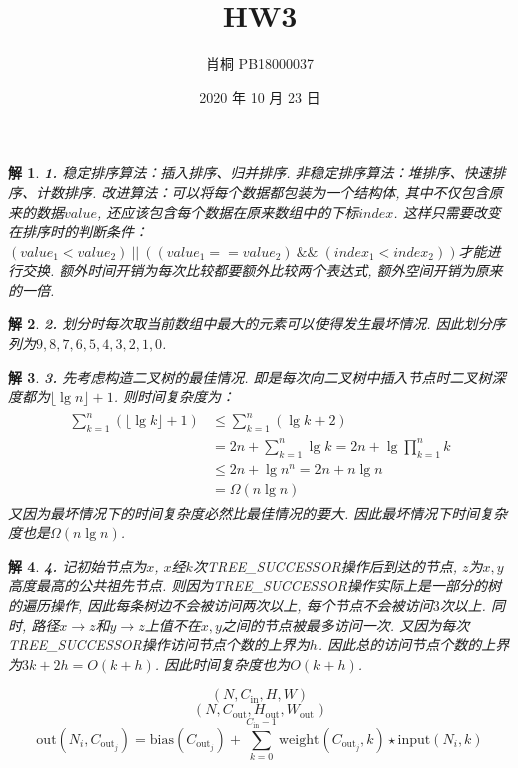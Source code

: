 \documentclass{article}
\begin{document}
	\title{HW3}
	\author{肖桐 PB18000037}
	\date{2020 年 10 月 23 日}
	\maketitle

	\newtheorem*{solution}{解}

	\begin{solution}\textnormal{\textbf{1.}}
		稳定排序算法：插入排序、归并排序.\newline
		非稳定排序算法：堆排序、快速排序、计数排序.\newline
		改进算法：可以将每个数据都包装为一个结构体, 其中不仅包含原来的数据$value$,
		还应该包含每个数据在原来数组中的下标$index$.\newline
		这样只需要改变在排序时的判断条件：$(value_1 < value_2)\ ||\ ((value_1 == value_2)\ \&\&\ (index_1 < index_2))$才能进行交换.\newline
		额外时间开销为每次比较都要额外比较两个表达式, 额外空间开销为原来的一倍.
	\end{solution}
	\begin{solution}\textnormal{\textbf{2.}}
		划分时每次取当前数组中最大的元素可以使得发生最坏情况. 因此划分序列为$9, 8, 7, 6, 5, 4, 3, 2, 1, 0$.
	\end{solution}
	\begin{solution}\textnormal{\textbf{3.}}
		先考虑构造二叉树的最佳情况. 即是每次向二叉树中插入节点时二叉树深度都为$\lfloor\lg n\rfloor + 1$.
		则时间复杂度为：
		$$
		\begin{aligned}
			\begin{split}
				\sum_{k = 1}^{n}(\lfloor\lg k\rfloor + 1) &\leq \sum_{k = 1}^{n}(\lg k + 2) \\
				&= 2n + \sum_{k = 1}^{n}\lg k = 2n + \lg\prod_{k = 1}^{n}k \\
				&\leq 2n + \lg n^n = 2n + n\lg n \\
				&= \Omega(n\lg n)
			\end{split}
		\end{aligned}
		$$
		又因为最坏情况下的时间复杂度必然比最佳情况的要大. 因此最坏情况下时间复杂度也是$\Omega(n\lg n)$.
	\end{solution}
	\begin{solution}\textnormal{\textbf{4.}}
		记初始节点为$x$, $x$经$k$次\textnormal{TREE\_SUCCESSOR}操作后到达的节点, $z$为$x, y$高度最高的公共祖先节点.\newline
		则因为\textnormal{TREE\_SUCCESSOR}操作实际上是一部分的树的遍历操作, 因此每条树边不会被访问两次以上, 每个节点不会被访问$3$次以上.\newline
		同时, 路径$x \to z$和$y \to z$上值不在$x, y$之间的节点被最多访问一次. 又因为每次\textnormal{TREE\_SUCCESSOR}操作访问节点个数的上界为$h$.\newline
		因此总的访问节点个数的上界为$3k + 2h = O(k + h)$. 因此时间复杂度也为$O(k + h)$.
	\end{solution}

	$$(N, C_{\text{in}}, H, W)$$
	$$(N, C_{\text{out}}, H_{\text{out}}, W_{\text{out}})$$
	$$\text{out}(N_i, C_{\text{out}_j}) = \text{bias}(C_{\text{out}_j}) +  
    \sum_{k = 0}^{C_{\text{in}} - 1} \text{weight}(C_{\text{out}_j}, k) \star \text{input}(N_i, k)$$
\end{document}
